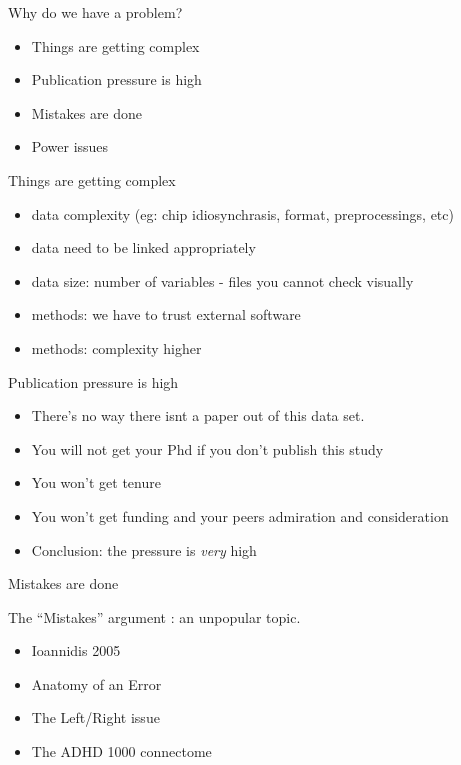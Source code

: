 \begin{frame}{Why do we have a problem?}

\begin{itemize}
\itemsep1pt\parskip0pt
\item
  Things are getting complex
\item
  Publication pressure is high
\item
  Mistakes are done
\item
  Power issues
\end{itemize}

\end{frame}

\begin{frame}{Things are getting complex}

\begin{itemize}
\itemsep1pt\parskip0pt
\item
  data complexity (eg: chip idiosynchrasis, format, preprocessings, etc)
\item
  data need to be linked appropriately
\item
  data size: number of variables - files you cannot check visually
\item
  methods: we have to trust external software
\item
  methods: complexity higher
\end{itemize}

\end{frame}

\begin{frame}{Publication pressure is high}

\begin{itemize}
\itemsep1pt\parskip0pt
\item
  There's no way there isnt a paper out of this data set.
\item
  You will not get your Phd if you don't publish this study
\item
  You won't get tenure
\item
  You won't get funding and your peers admiration and consideration
\item
  Conclusion: the pressure is \emph{very} high
\end{itemize}

\end{frame}

\begin{frame}{Mistakes are done}

The ``Mistakes'' argument : an unpopular topic.

\begin{itemize}
\itemsep1pt\parskip0pt
\item
  Ioannidis 2005
\item
  Anatomy of an Error
\item
  The Left/Right issue
\item
  The ADHD 1000 connectome
\end{itemize}

\end{frame}

